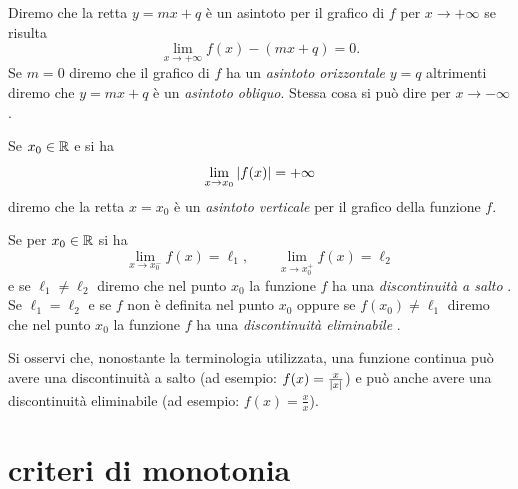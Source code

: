 \begin{definition}[asintoti]
Diremo che la retta $y=mx+q$ è un asintoto per il grafico di $f$ 
per $x\to +\infty$ se risulta
\[
  \lim_{x\to +\infty} f(x) - (mx+q) = 0.
\]
Se $m=0$ diremo che il grafico di $f$ ha un \emph{asintoto orizzontale} $y=q$
%
%
%
%
altrimenti diremo che $y=mx+q$ è un \emph{asintoto obliquo}.
Stessa cosa si può dire per $x\to -\infty$.

Se $x_0\in {\mathbb R}$ e si ha 
\[
  \lim_{x\to x_0} {\left|f(x)\right|} = +\infty
\]
diremo che la retta $x=x_0$ è un \emph{asintoto verticale}%
%
 per il 
grafico della funzione $f$.
\end{definition}

\begin{definition}
Se per $x_0\in {\mathbb R}$ si ha 
\[
  \lim_{x\to x_0^-} f(x) = \ell_1, 
  \qquad 
  \lim_{x\to x_0^+} f(x) = \ell_2
\]
e se $\ell_1\neq \ell_2$ diremo che nel punto $x_0$ 
la funzione $f$ ha una \emph{discontinuità a salto}%
%
.
Se $\ell_1=\ell_2$ e se $f$ non è definita nel punto $x_0$ 
oppure se $f(x_0)\neq \ell_1$ diremo che 
nel punto $x_0$ la funzione $f$ 
ha una \emph{discontinuità eliminabile}%
%
.
\end{definition}

Si osservi che, nonostante la terminologia utilizzata,
una funzione continua può avere una discontinuità 
a salto (ad esempio: $f(x)=\frac{x}{{\left|x\right|}}$) 
e può anche avere una discontinuità eliminabile
(ad esempio: $f(x) = \frac{x}{x}$).

\section{criteri di monotonia}

